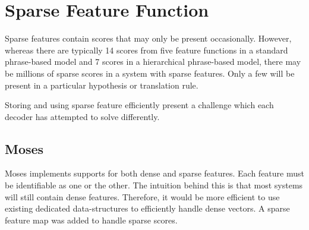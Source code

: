 \documentclass{pbml}
\begin{document}
% 


\section{Sparse Feature Function}

Sparse features contain scores that may only be present occasionally. However, whereas there are typically 14 scores from five feature functions in a standard phrase-based model and 7 scores in a hierarchical phrase-based model, there may be millions of sparse scores in a system with sparse features. Only a few will be present in a particular hypothesis or translation rule.

Storing and using sparse feature efficiently present a challenge which each decoder has attempted to solve differently.

\subsection{Moses}
Moses implements supports for both dense and sparse features. Each feature must be identifiable as one or the other. The intuition behind this is that most systems will still contain dense features. Therefore, it would be more efficient to use existing dedicated data-structures to efficiently handle dense vectors. A sparse feature map was added to handle sparse scores.
\end{document}
